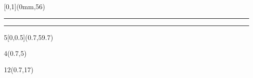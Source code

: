 \begin{frame}[plain]
  \begin{textblock*}{\paperwidth}[0,1](0mm,56\TPVertModule)
    \textcolor{rouge}{\rule{\banderougewidth}{\banderougeheight}}%
    \textcolor{bleu}{\rule{\bandeorwidth}{\bandeorheight}}           %
  \end{textblock*}

	\begin{textblock*}{5\TPHorizModule}[0,0.5](0.7\TPHorizModule,59.7\TPVertModule)
		\site
	\end{textblock*}

	\begin{textblock*}{4\TPHorizModule}(0.7\TPHorizModule,5\TPVertModule)
		\textcolor[rgb]{0.13,0.13,0.13}{\webinaire}
	\end{textblock*}

  \begin{textblock*}{12\TPHorizModule}(0.7\TPHorizModule,17\TPVertModule)
	\textcolor[rgb]{0.13,0.13,0.13}{\titlefmt}
	\end{textblock*}
\end{frame}

\endgroup


